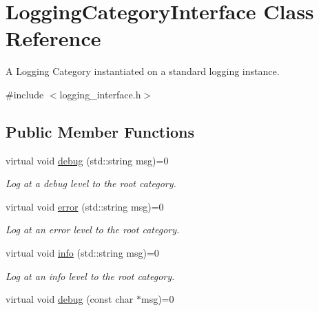 \hypertarget{classLoggingCategoryInterface}{\section{Logging\-Category\-Interface Class Reference}
\label{classLoggingCategoryInterface}
}


A Logging Category instantiated on a standard logging instance.  




{\ttfamily \#include $<$logging\-\_\-interface.\-h$>$}

\subsection*{Public Member Functions}
\begin{DoxyCompactItemize}
\item 
\hypertarget{classLoggingCategoryInterface_aca90c0a8380658a3918ee4c6eb60314b}{virtual void \hyperlink{classLoggingCategoryInterface_aca90c0a8380658a3918ee4c6eb60314b}{debug} (std\-::string msg)=0}\label{classLoggingCategoryInterface_aca90c0a8380658a3918ee4c6eb60314b}

\begin{DoxyCompactList}\small\item\em Log at a debug level to the root category. \end{DoxyCompactList}\item 
\hypertarget{classLoggingCategoryInterface_a377b5248cd5f1c67dc7f13250bf56d78}{virtual void \hyperlink{classLoggingCategoryInterface_a377b5248cd5f1c67dc7f13250bf56d78}{error} (std\-::string msg)=0}\label{classLoggingCategoryInterface_a377b5248cd5f1c67dc7f13250bf56d78}

\begin{DoxyCompactList}\small\item\em Log at an error level to the root category. \end{DoxyCompactList}\item 
\hypertarget{classLoggingCategoryInterface_a2a8bf026f9aeaea95f443744292e237b}{virtual void \hyperlink{classLoggingCategoryInterface_a2a8bf026f9aeaea95f443744292e237b}{info} (std\-::string msg)=0}\label{classLoggingCategoryInterface_a2a8bf026f9aeaea95f443744292e237b}

\begin{DoxyCompactList}\small\item\em Log at an info level to the root category. \end{DoxyCompactList}\item 
\hypertarget{classLoggingCategoryInterface_a6633ea62fbd9850de9f95c42bcb98209}{virtual void \hyperlink{classLoggingCategoryInterface_a6633ea62fbd9850de9f95c42bcb98209}{debug} (const char $\ast$msg)=0}\label{classLoggingCategoryInterface_a6633ea62fbd9850de9f95c42bcb98209}


\end{DoxyCompactItemize}
